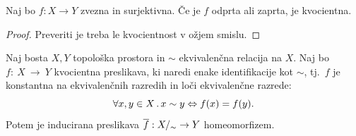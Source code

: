 \begin{lema}
    Naj bo \(f: X \to Y\) zvezna in surjektivna. Če je \(f\) odprta ali zaprta, je kvocientna.
\end{lema}

\begin{proof}
    Preveriti je treba le kvocientnost v ožjem smislu.
\end{proof}

\begin{izrek}
    Naj bosta \(X, Y\) topološka prostora in \(\sim\) ekvivalenčna relacija na \(X\). Naj bo \(f:~X~\to~Y\) kvocientna preslikava, ki naredi enake identifikacije kot \(\sim\), tj.\ \(f\) je konstantna na ekvivalenčnih razredih in loči ekvivalenčne razrede:
    \[\forall x, y \in X \,.\, x \sim y \Leftrightarrow f(x) = f(y).\]
    Potem je inducirana preslikava \(\overline{f}: {X/_\sim} \to Y\) homeomorfizem.
\end{izrek}